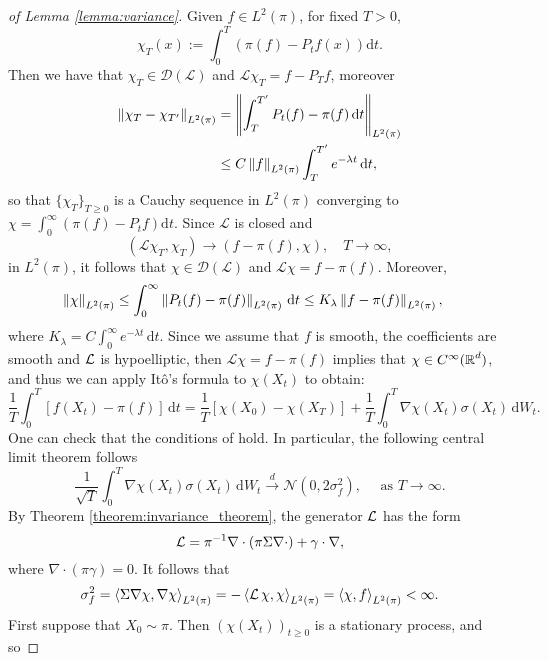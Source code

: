 \begin{proof}[of Lemma \ref{lemma:variance}]
Given $f \in L^2(\pi)$, for fixed $T > 0$, 
\begin{equation}
  \chi_T(x) := \int_{0}^{T} \left(\pi(f) - P_t f(x)\right)\mathrm{d}t.
\end{equation}
Then we have that $\chi_T \in \mathcal{D}(\mathcal{L})$ and $\mathcal{L}\chi_T  = f - P_T f$, moreover
\begin{align*}
  \left\lVert{\chi_{T} - \chi_{T'}}\right\rVert_{L^2(\pi)} &= \left\lVert{\int^{T'}_{T} P_t(f)-\pi(f)\,\mathrm{d}t}\right\rVert_{L^2(\pi)}\\
  &\leq C\left\lVert{f}\right\rVert_{L^2(\pi)}\int_{T}^{T'}e^{-\lambda t}\,\mathrm{d}t,
\end{align*}
so that $\lbrace \chi_T \rbrace_{T \geq 0}$ is a Cauchy sequence in $L^2(\pi)$ converging to $\chi = \int_0^\infty \left(\pi(f) - P_tf\right)\mathrm{d}t$.  Since $\mathcal{L}$ is closed and
$$
  (\mathcal{L}\chi_T, \chi_T) \rightarrow (f-\pi(f), \chi),\quad T \rightarrow \infty,
$$
in $L^2(\pi)$, it follows that $\chi\in\mathcal{D}(\mathcal{L})$ and $\mathcal{L}\chi = f - \pi(f)$.  Moreover,
$$
  \left\lVert{\chi}\right\rVert_{L^{2}(\pi)} \leq \int_0^\infty \left\lVert{P_t(f) - \pi(f)}\right\rVert_{L^2(\pi)}\,\mathrm{d}t \leq K_{\lambda}\left\lVert{f-\pi(f)}\right\rVert_{L^2(\pi)},\quad 
$$
where $K_{\lambda} = C\int_0^\infty e^{-\lambda t}\,\mathrm{d}t$. 
Since we assume that $f$ is smooth, the coefficients are smooth and $\operatorname{\mathcal{L}}$ is hypoelliptic, then $\mathcal{L}\chi = f-\pi(f)$ implies that  $\chi \in C^{\infty}(\operatorname{\mathbb{R}}^d)$, and thus we can apply It\^{o}'s formula to $\chi(X_t)$ to obtain:
$$
\frac{1}{T}\int_0^T \left[f(X_t) - \pi(f)\right]\,\mathrm{d}t = \frac{1}{T}\left[\chi(X_0) - \chi(X_T)\right] + \frac{1}{T}\int_0^T \nabla\chi(X_t)\sigma(X_t)\,\mathrm{d}W_t.
$$
One can check that the conditions of \cite[Theorem 7.1.4]{EthierKu86} hold.  In particular, the following central limit theorem follows
$$
	\frac{1}{\sqrt{T}}\int_0^T \nabla\chi(X_t)\sigma(X_t)\,\mathrm{d}W_t \xrightarrow{d} \mathcal{N}(0,2\sigma^2_f),\quad \mbox{ as } T \rightarrow \infty.
$$
By Theorem \ref{theorem:invariance_theorem}, the generator $\operatorname{\mathcal{L}}$ has the form
$$
	\operatorname{\mathcal{L}} = \pi^{-1}\nabla\cdot\left(\pi\Sigma \nabla \cdot \right) + \gamma\cdot\nabla,
$$
where $\nabla\cdot(\pi \gamma) = 0$.  It follows that
\begin{equation}
\label{eq:variance_equation}
\sigma^2_f = \left\langle \Sigma \nabla\chi, \nabla\chi \right\rangle_{L^2(\pi)} = -\left\langle \operatorname{\mathcal{L}} \chi, \chi \right\rangle_{L^2(\pi)}  = \left\langle \chi, f \right\rangle_{L^2(\pi)} < \infty.
\end{equation}
First suppose that $X_0 \sim \pi$.  Then $(\chi(X_t))_{t\geq 0}$ is a stationary process, and so 

\end{proof}
